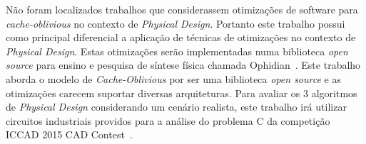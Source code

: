 Não foram localizados trabalhos que considerassem otimizações de software para \textit{cache-oblivious} no contexto de \textit{Physical Design}.
Portanto este trabalho possui como principal diferencial a aplicação de técnicas de otimizações no contexto de \textit{Physical Design}.
Estas otimizações serão implementadas numa biblioteca \textit{open source} para ensino e pesquisa de síntese física chamada Ophidian~\cite{ophidian}.
Este trabalho aborda o modelo de \textit{Cache-Oblivious} por ser uma biblioteca \textit{open source}                                                                                                                                                                e as otimizações carecem suportar diversas arquiteturas.
Para avaliar os 3 algoritmos de \textit{Physical Design} considerando um cenário realista, este trabalho irá utilizar circuitos industriais providos para a análise do problema C da competição ICCAD 2015 CAD Contest~\cite{kim2015}.

